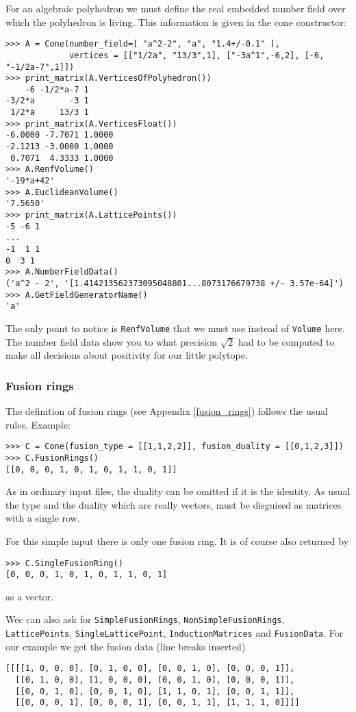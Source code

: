 \begin{small}
For an algebraic polyhedron we must define the real embedded number field over which the polyhedron is living. This information is given in the cone constructor:
\begin{Verbatim}
>>> A = Cone(number_field=[ "a^2-2", "a", "1.4+/-0.1" ], 
             vertices = [["1/2a", "13/3",1], ["-3a^1",-6,2], [-6, "-1/2a-7",1]])
>>> print_matrix(A.VerticesOfPolyhedron())
    -6 -1/2*a-7 1
-3/2*a       -3 1
 1/2*a     13/3 1
>>> print_matrix(A.VerticesFloat())
-6.0000 -7.7071 1.0000
-2.1213 -3.0000 1.0000
 0.7071  4.3333 1.0000
>>> A.RenfVolume()
'-19*a+42'
>>> A.EuclideanVolume()
'7.5650'
>>> print_matrix(A.LatticePoints())
-5 -6 1
...
-1  1 1
0  3 1
>>> A.NumberFieldData()
('a^2 - 2', '[1.414213562373095048801...8073176679738 +/- 3.57e-64]')
>>> A.GetFieldGeneratorName()
'a'
\end{Verbatim}

The only point to notice is \verb|RenfVolume| that we must use instead of \verb|Volume| here. The number field data show you to what precision $\sqrt2$ had to be computed to make all decisions about positivity for our little polytope.

\subsubsection{Fusion rings}

The definition of fusion rings (see Appendix \ref{fusion_rings}) follows the usual rules. Example:
\begin{Verbatim}
>>> C = Cone(fusion_type = [[1,1,2,2]], fusion_duality = [[0,1,2,3]])
>>> C.FusionRings()
[[0, 0, 0, 1, 0, 1, 0, 1, 1, 0, 1]]
\end{Verbatim}
As in ordinary input files, the duality can be omitted if it is the identity. As usual the type and the duality which are really vectors, must be disguised as matrices with a single row.

For this simple input there is only one fusion ring. It is of course also returned by 
\begin{Verbatim}
>>> C.SingleFusionRing()
[0, 0, 0, 1, 0, 1, 0, 1, 1, 0, 1]
\end{Verbatim} 
as a vector.

Wec can also ask for \verb*|SimpleFusionRings|, \verb*|NonSimpleFusionRings|, \verb*|LatticePoints|, \verb*|SingleLatticePoint|, \verb*|InductionMatrices| and \verb*|FusionData|. For our example we get the fusion data (line breaks inserted) 
\begin{Verbatim}
[[[[1, 0, 0, 0], [0, 1, 0, 0], [0, 0, 1, 0], [0, 0, 0, 1]],
  [[0, 1, 0, 0], [1, 0, 0, 0], [0, 0, 1, 0], [0, 0, 0, 1]],
  [[0, 0, 1, 0], [0, 0, 1, 0], [1, 1, 0, 1], [0, 0, 1, 1]],
  [[0, 0, 0, 1], [0, 0, 0, 1], [0, 0, 1, 1], [1, 1, 1, 0]]]]
\end{Verbatim}


\end{small}
